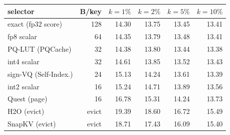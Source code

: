 \begin{tabular}{l r r r r r}
\toprule
selector & B/key & $k{=}1\%$ & $k{=}2\%$ & $k{=}5\%$ & $k{=}10\%$ \\
\midrule
exact (fp32 score) & 128 & 14.30 & 13.75 & 13.45 & 13.41 \\
fp8 scalar & 64 & 14.35 & 13.79 & 13.48 & 13.41 \\
PQ-LUT (PQCache) & 32 & 14.38 & 13.80 & 13.44 & 13.38 \\
int4 scalar & 32 & 14.61 & 13.85 & 13.52 & 13.43 \\
sign-VQ (Self-Index.) & 24 & 15.13 & 14.24 & 13.61 & 13.39 \\
int2 scalar & 16 & 15.24 & 14.71 & 13.89 & 13.56 \\
Quest (page) & 16 & 16.78 & 15.31 & 14.24 & 13.73 \\
H2O (evict) & evict & 19.39 & 18.60 & 16.72 & 15.49 \\
SnapKV (evict) & evict & 18.71 & 17.43 & 16.09 & 15.40 \\
\bottomrule
\end{tabular}

